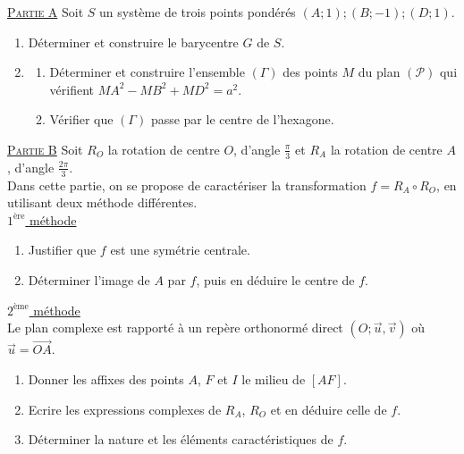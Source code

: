       \noindent \underline{\textsc{Partie A}} \newline
      Soit $S$ un syst\`eme de trois points pond\'er\'es $(A;1);(B;-1);(D;1)$.
      \begin{enumerate}
            \item D\'eterminer et construire le barycentre $G$ de $S$.
            \item \begin{enumerate}
                        \item D\'eterminer et construire l'ensemble $(\Gamma)$ des 
                        points $M$ du plan $(\mathscr{P})$ qui v\'erifient 
                        $MA^2 - MB^2 + MD^2 = a^2$.
                        \item V\'erifier que $(\Gamma)$ passe par le centre de l'hexagone.
                  \end{enumerate}
      \end{enumerate}
      \noindent \underline{\textsc{Partie B}} \newline
      Soit $R_O$ la rotation de centre $O$, d'angle $\frac{\pi}{3}$ 
      et $R_A$ la rotation de centre $A$, d'angle $\frac{2\pi}{3}$. \\
      Dans cette partie, on se propose de caract\'eriser la transformation 
      $f = R_A \circ R_O$, en utilisant deux m\'ethode diff\'erentes. \\
            \noindent \underline{$\text{1}^\text{\`ere}$ m\'ethode} 
            \begin{enumerate}
                  \item Justifier que $f$ est une sym\'etrie centrale.
                  \item D\'eterminer l'image de $A$ par $f$, puis en d\'eduire le centre de $f$.
            \end{enumerate}
            \noindent \underline{$\text{2}^\text{\`eme}$ m\'ethode} \\
            Le plan complexe est rapport\'e \`a un rep\`ere orthonorm\'e direct
            $(O ; \vec{u} , \vec{v})$ o\`u $\vec{u} = \vec{OA}$.
            \begin{enumerate}
                  \item Donner les affixes des points $A$, $F$ et $I$ le milieu de $[AF]$.
                  \item Ecrire les expressions complexes de $R_A$, $R_O$ et 
                        en d\'eduire celle de $f$.
                  \item D\'eterminer la nature et les \'el\'ements caract\'eristiques de $f$.
            \end{enumerate}

